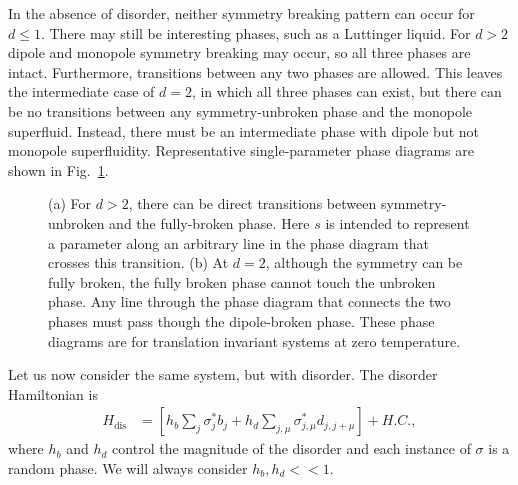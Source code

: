\documentclass[twocolumn, longbibliography]{revtex4-2}
\begin{document}
In the absence of disorder, neither symmetry breaking pattern can occur for $d\le 1$. There may still be interesting phases, such as a Luttinger liquid.
For $d>2$ dipole and monopole symmetry breaking may occur, so all three phases are intact. Furthermore, transitions between any two phases are allowed.
This leaves the intermediate case of $d=2$, in which all three phases can exist, but there can be no transitions between any symmetry-unbroken phase and the monopole superfluid. Instead, there must be an intermediate phase with dipole but not monopole superfluidity. Representative single-parameter phase diagrams are shown in Fig.~\ref{fig:phases}.

\begin{figure}
\centering


\caption{(a) For  $d>2$, there can be direct transitions between symmetry-unbroken and the fully-broken phase. Here $s$ is intended to represent a parameter along an arbitrary line in the phase diagram that crosses this transition. (b) At $d=2$, although the symmetry can be fully broken, the fully broken phase cannot touch the unbroken phase. Any line through the phase diagram that connects the two phases must pass though the dipole-broken phase. These phase diagrams are for translation invariant systems at zero temperature.}
\label{fig:phases}
\end{figure}

Let us now consider the same system, but with disorder.  The disorder Hamiltonian is
\begin{align}
H_\text{dis} &= \left[h_b\sum_j \sigma^*_jb_j + h_d \sum_{j,\mu} \sigma^*_{j,\mu}d_{j,j+\mu}\right] + H.C.,
\end{align}
where $h_b$ and $h_d$ control the magnitude of the disorder and each instance of $\sigma$ is a random phase. We will always consider $h_b,h_d<<1$.
\end{document}
